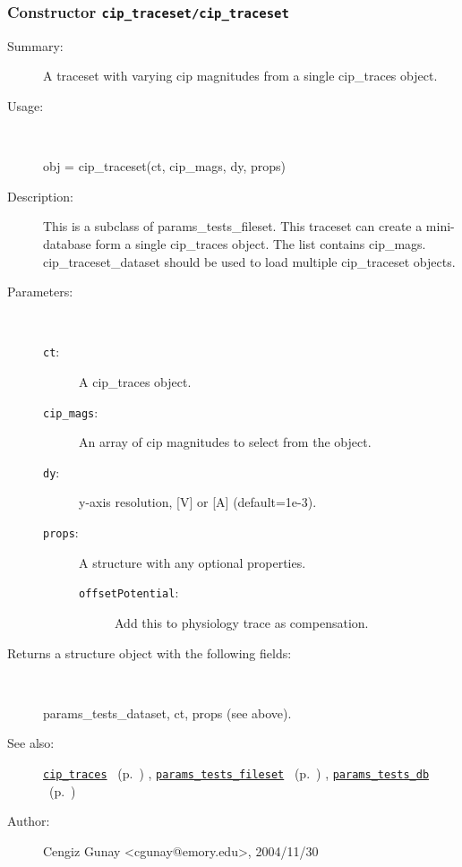 \subsubsection[Constructor \texttt{cip\_traceset}]{Constructor \texttt{cip\_traceset/cip\_traceset}}%
%
\label{ref_cip_traceset__cip_traceset}%
\hypertarget{ref_cip_traceset__cip_traceset}{}%
\begin{description}
\item[Summary:]A traceset with varying cip magnitudes from a single cip\_traces object.
%
\item[Usage:]~%
\begin{lyxcode}%
obj = cip\_traceset(ct, cip\_mags, dy, props)
%
\end{lyxcode}%
%
\item[Description:]%
This is a subclass of params\_tests\_fileset. This traceset can create a 
 mini-database form a single cip\_traces object. The list contains cip\_mags.
 cip\_traceset\_dataset should be used to load multiple cip\_traceset objects.
\item[Parameters:]~
\begin{description}%
\item[\texttt{ct}:]
 A cip\_traces object.
\item[\texttt{cip\_mags}:]
 An array of cip magnitudes to select from the object.
\item[\texttt{dy}:]
 y-axis resolution, [V] or [A] (default=1e-3).
\item[\texttt{props}:]
 A structure with any optional properties.
\begin{description}%
\item[\texttt{offsetPotential}:]
 Add this to physiology trace as compensation.
\end{description}%
\end{description}%
%
\item[Returns a structure object with the following fields:
]~

	params\_tests\_dataset,
	ct, props (see above).
%
%
\item[See also:]%
\hyperlink{ref_cip_traces}{\texttt{cip\_traces}}%
\ (p.~\pageref{ref_cip_traces})%
%
, \hyperlink{ref_params_tests_fileset}{\texttt{params\_tests\_fileset}}%
\ (p.~\pageref{ref_params_tests_fileset})%
%
, \hyperlink{ref_params_tests_db}{\texttt{params\_tests\_db}}%
\ (p.~\pageref{ref_params_tests_db})%
%
%
\item[Author:]%
Cengiz Gunay <cgunay@emory.edu>, 2004/11/30
%
\end{description}
\methodline%
